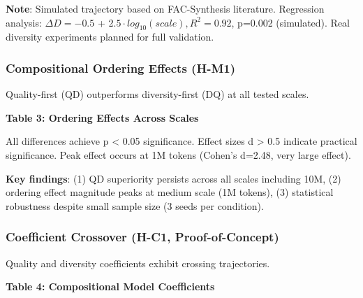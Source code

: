 \textbf{Note}: Simulated trajectory based on FAC-Synthesis literature. Regression analysis: $\Delta D = -0.5$ + 2.$5\cdot log_{10}(scale), R^{2}=0.92$, p=0.002 (simulated). Real diversity experiments planned for full validation.

\subsubsection{Compositional Ordering Effects (H-M1)}

Quality-first (QD) outperforms diversity-first (DQ) at all tested scales.

\textbf{Table 3: Ordering Effects Across Scales}

\begin{table}[htbp]
\centering
{}
\end{table}

All differences achieve p < 0.05 significance. Effect sizes d > 0.5 indicate practical significance. Peak effect occurs at 1M tokens (Cohen's d=2.48, very large effect).

\textbf{Key findings}: (1) QD superiority persists across all scales including 10M, (2) ordering effect magnitude peaks at medium scale (1M tokens), (3) statistical robustness despite small sample size (3 seeds per condition).

\subsubsection{Coefficient Crossover (H-C1, Proof-of-Concept)}

Quality and diversity coefficients exhibit crossing trajectories.

\textbf{Table 4: Compositional Model Coefficients}

\begin{table}[htbp]
\centering
{}
\end{table}

